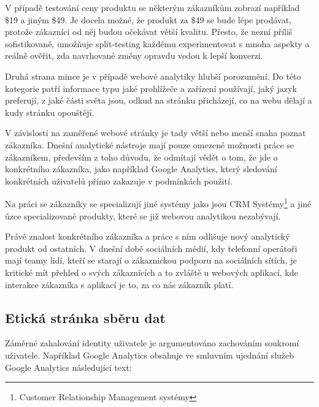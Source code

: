 \documentclass[bc,male,java,dept456]{diploma}						%
\begin{document}
V případě testování ceny produktu se některým zákazníkům zobrazí například \$19 a jiným \$49. Je docela možné, že produkt za \$49 se bude lépe prodávat, protože zákazníci od něj budou očekávat větší kvalitu. Přesto, že nezní příliš sofistikovaně, umožňuje split-testing každému experimentovat s mnoha aspekty a reálně ověřit, zda navrhované změny opravdu vedou k lepší konverzi.




Druhá strana mince je v případě webové analytiky hlubší porozumění. Do této kategorie patří informace typu jaké prohlížeče a zařízení používají, jaký jazyk preferují, z jaké části světa jsou, odkud na stránku přicházejí, co na webu dělají a kudy stránku opouštějí. 

V závislosti na zaměřené webové stránky je tady větší nebo menší snaha poznat zákazníka. Dnešní analytické nástroje mají pouze omezené možnosti práce se zá\-ka\-zní\-kem, především z toho důvodu, že odmítají vědět o tom, že jde o konkrétního zákazníka, jako například Google Analytics, který sledování konkrétních uživatelů přímo zakazuje v podmínkách použití.

Na práci se zákazníky se specializují jiné systémy jako jsou CRM Systémy\footnote{Customer Relationship Management systémy} a jiné úzce specializované produkty, které se již webovou analytikou nezabývají. 

Právě znalost konkrétního zákazníka a práce s ním odlišuje nový analytický produkt od ostatních. V dnešní době sociálních médií, kdy telefonní operátoři mají teamy lidí, kteří se starají o zákaznickou podporu na sociálních sítích, je kritické mít přehled o svých zákaznících a to zvláště u webových aplikací, kde interakce zákazníka s aplikací je to, za co nás zákazník platí.



\subsection{Etická stránka sběru dat}

Záměrné zahalování identity uživatele je argumentováno zachováním soukromí u\-ži\-va\-te\-le. Například Google Analytics obsahuje ve smluvním ujednání služeb Google Analytics následující text:
\end{document}
